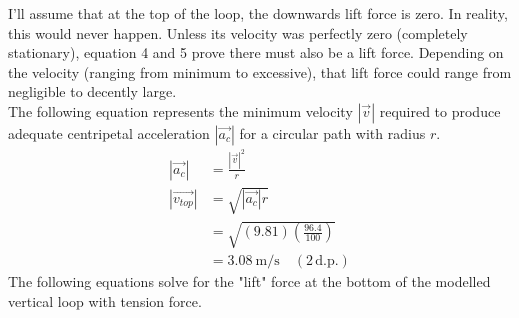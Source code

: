 \documentclass[11pt, a4paper]{article}
\begin{document}
	I'll assume that at the top of the loop, the downwards lift force is zero. In reality, this would never happen. Unless its velocity was perfectly zero (completely stationary), equation 4 and 5 prove there must also be a lift force. Depending on the velocity (ranging from minimum to excessive), that lift force could range from negligible to decently large.\\
	The following equation represents the minimum velocity $|\vec{v}|$ required to produce adequate centripetal acceleration $|\vec{a_c}|$ for a circular path with radius $r$.
	\begin{align}
		|\vec{a_c}|&=\frac{|\vec{v}|^2}{r}\\
		|\vec{v_{top}}|&=\sqrt{|\vec{a_c}|r}\\
		&=\sqrt{(9.81)\left(\frac{96.4}{100}\right)}\\
		&= \SI{3.08}{\meter\per\second} \quad (2\, \text{d.p.})
	\end{align}
	The following equations solve for the "lift" force at the bottom of the modelled vertical loop with tension force.
\end{document}
